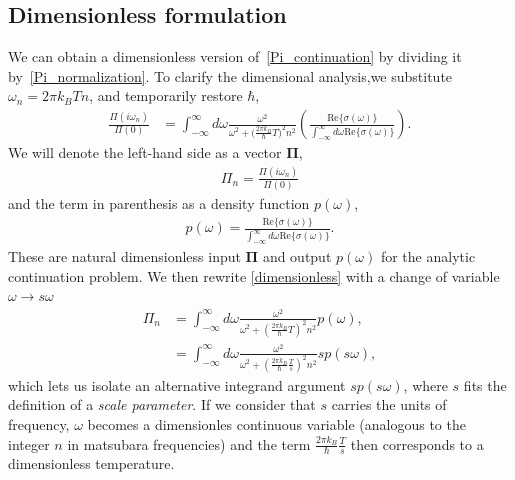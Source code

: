 \documentclass[notitlepage, 11pt, nofootinbib]{revtex4-1}
\renewcommand{\vec}[1]{\bm{#1}}
\begin{document}
\subsection{Dimensionless formulation}
\label{sec_dimensionless}
We can obtain a dimensionless version of~\eqref{Pi_continuation} by dividing it by~\eqref{Pi_normalization}. To clarify the dimensional analysis,we substitute $\omega_n = 2\pi k_BTn$, and temporarily restore $\hbar$,
\begin{align}
\frac{\Pi(i\omega_n)}{\Pi(0)}
&=
\int_{-\infty}^{\infty} d\omega \frac{\omega^2}{
\omega^2+
\big(\frac{2\pi k_B}{\hbar}T\big)
^2n^2
}\left(
\frac{\text{Re}\{ \sigma(\omega) \}}
{\int_{-\infty}^{\infty} d\omega \text{Re}\{ \sigma(\omega) \}}
\right).
\label{dimensionless}
\end{align}
We will denote the left-hand side as a vector $\vec \Pi$, \begin{align}
\Pi_n = \frac{\Pi(i\omega_n)}{\Pi(0)} 
\end{align}
and the term in parenthesis as a density function $p(\omega)$,
\begin{align}
p(\omega) =
\frac{\text{Re}\{ \sigma(\omega) \}}
{\int_{-\infty}^{\infty} d\omega \text{Re}\{ \sigma(\omega) \}}.
\label{eq_def_density}
\end{align}
These are natural dimensionless input $\vec\Pi$ and output $p(\omega)$ for the analytic continuation problem. We then rewrite \eqref{dimensionless} with a change of variable $\omega\rightarrow s\omega$
\begin{align}
\Pi_n
&=
\int_{-\infty}^{\infty} d\omega \frac{\omega^2}{\omega^2 + \left(\frac{2\pi k_B}{\hbar}T\right)^2n^2}
p(\omega),
\label{dimensionless_with_p1}
\\
&=
\int_{-\infty}^{\infty} d\omega \frac{\omega^2}{\omega^2 + \left(\frac{2\pi k_B}{\hbar}\frac{T}{s}\right)^2n^2}
sp(s\omega),
\label{dimensionless_with_p2}
\end{align}
which lets us isolate an alternative integrand argument $sp(s\omega)$, where $s$ fits the definition of a \emph{scale parameter}.
If we consider that $s$ carries the units of frequency, $\omega$ becomes a dimensionles continuous variable (analogous to the integer $n$ in matsubara frequencies) and the term $\frac{2\pi k_B}{\hbar}\frac{T}{s}$ then corresponds to a dimensionless temperature.
\end{document}
